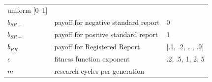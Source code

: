 \documentclass[british,,man,mask,floatsintext]{apa6}
\begin{document}
\begin{longtable}[]{@{}lll@{}}
\begin{minipage}[t]{0.27\columnwidth}
uniform {[}0--1{]}\strut
\end{minipage}\tabularnewline
\begin{minipage}[t]{0.32\columnwidth}\raggedright
\(b_{SR-}\)\strut
\end{minipage} & \begin{minipage}[t]{0.32\columnwidth}\raggedright
payoff for negative standard report\strut
\end{minipage} & \begin{minipage}[t]{0.27\columnwidth}\raggedright
0\strut
\end{minipage}\tabularnewline
\begin{minipage}[t]{0.32\columnwidth}\raggedright
\(b_{SR+}\)\strut
\end{minipage} & \begin{minipage}[t]{0.32\columnwidth}\raggedright
payoff for positive standard report\strut
\end{minipage} & \begin{minipage}[t]{0.27\columnwidth}\raggedright
1\strut
\end{minipage}\tabularnewline
\begin{minipage}[t]{0.32\columnwidth}\raggedright
\(b_{RR}\)\strut
\end{minipage} & \begin{minipage}[t]{0.32\columnwidth}\raggedright
payoff for Registered Report\strut
\end{minipage} & \begin{minipage}[t]{0.27\columnwidth}\raggedright
{[}.1, .2, \ldots{}, .9{]}\strut
\end{minipage}\tabularnewline
\begin{minipage}[t]{0.32\columnwidth}\raggedright
\(\epsilon\)\strut
\end{minipage} & \begin{minipage}[t]{0.32\columnwidth}\raggedright
fitness function exponent\strut
\end{minipage} & \begin{minipage}[t]{0.27\columnwidth}\raggedright
.2, .5, 1, 2, 5\strut
\end{minipage}\tabularnewline
\begin{minipage}[t]{0.32\columnwidth}\raggedright
\(m\)\strut
\end{minipage} & \begin{minipage}[t]{0.32\columnwidth}\raggedright
research cycles per generation\strut
\end{minipage} & \begin{minipage}[t]{0.27\columnwidth}\raggedright

\end{minipage}
\end{longtable}
\end{document}
